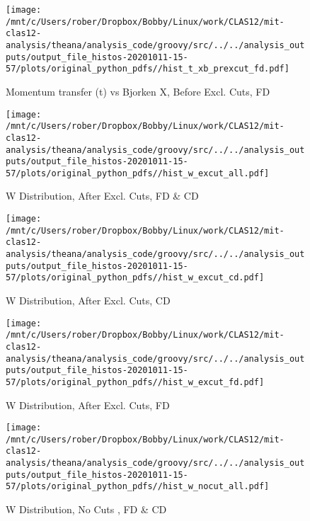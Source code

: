 \documentclass{article}
\begin{document}
\begin{landscape}
\begin{figure}[h]
        \texttt{[image: /mnt/c/Users/rober/Dropbox/Bobby/Linux/work/CLAS12/mit-clas12-analysis/theana/analysis\_code/groovy/src/../../analysis\_outputs/output\_file\_histos-20201011-15-57/plots/original\_python\_pdfs//hist\_t\_xb\_prexcut\_fd.pdf]}
        \captionsetup{textformat=empty,labelformat=blank}
        \caption{Momentum transfer (t) vs Bjorken X, Before Excl. Cuts, FD}
    \end{figure}
    \clearpage
    
    \begin{figure}[h]
        \centering

        \texttt{[image: /mnt/c/Users/rober/Dropbox/Bobby/Linux/work/CLAS12/mit-clas12-analysis/theana/analysis\_code/groovy/src/../../analysis\_outputs/output\_file\_histos-20201011-15-57/plots/original\_python\_pdfs//hist\_w\_excut\_all.pdf]}
        \captionsetup{textformat=empty,labelformat=blank}
        \caption{W Distribution, After Excl. Cuts, FD \& CD}
    \end{figure}
    \clearpage
    
    \begin{figure}[h]
        \centering

        \texttt{[image: /mnt/c/Users/rober/Dropbox/Bobby/Linux/work/CLAS12/mit-clas12-analysis/theana/analysis\_code/groovy/src/../../analysis\_outputs/output\_file\_histos-20201011-15-57/plots/original\_python\_pdfs//hist\_w\_excut\_cd.pdf]}
        \captionsetup{textformat=empty,labelformat=blank}
        \caption{W Distribution, After Excl. Cuts, CD}
    \end{figure}
    \clearpage
    
    \begin{figure}[h]
        \centering

        \texttt{[image: /mnt/c/Users/rober/Dropbox/Bobby/Linux/work/CLAS12/mit-clas12-analysis/theana/analysis\_code/groovy/src/../../analysis\_outputs/output\_file\_histos-20201011-15-57/plots/original\_python\_pdfs//hist\_w\_excut\_fd.pdf]}
        \captionsetup{textformat=empty,labelformat=blank}
        \caption{W Distribution, After Excl. Cuts, FD}
    \end{figure}
    \clearpage
    
    \begin{figure}[h]
        \centering

        \texttt{[image: /mnt/c/Users/rober/Dropbox/Bobby/Linux/work/CLAS12/mit-clas12-analysis/theana/analysis\_code/groovy/src/../../analysis\_outputs/output\_file\_histos-20201011-15-57/plots/original\_python\_pdfs//hist\_w\_nocut\_all.pdf]}
        \captionsetup{textformat=empty,labelformat=blank}
        \caption{W Distribution, No Cuts , FD \& CD}
    \end{figure}
    \clearpage
    

\end{landscape}
\end{document}

